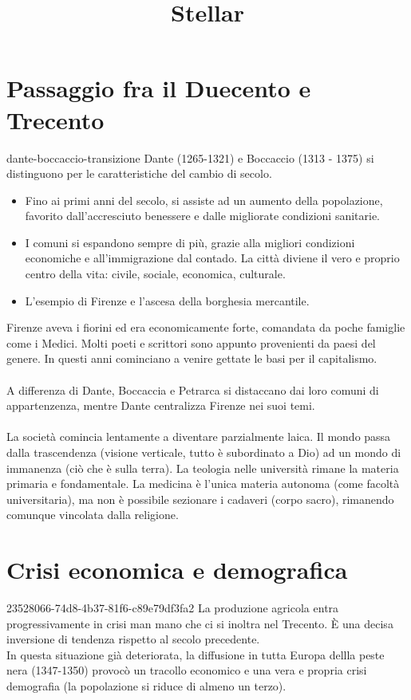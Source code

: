 \documentclass[preview]{standalone}
\begin{document}
\title{Stellar}
\genpage

\section{Passaggio fra il Duecento e Trecento}

\begin{snippet}{dante-boccaccio-transizione}
    Dante (1265-1321) e Boccaccio (1313 - 1375)
    si distinguono per le caratteristiche del cambio di secolo.
    
    \begin{itemize}
        \item Fino ai primi anni del secolo, si assiste ad un aumento della popolazione, favorito dall'accresciuto benessere e dalle migliorate condizioni sanitarie.
        \item I comuni si espandono sempre di più, grazie alla migliori condizioni economiche e all'immigrazione dal contado. La città diviene il vero e proprio centro della vita: civile, sociale, economica, culturale.
        \item L'esempio di Firenze e l'ascesa della borghesia mercantile.
    \end{itemize}
    
    Firenze aveva i fiorini ed era economicamente forte, comandata da poche famiglie come i Medici.
    Molti poeti e scrittori sono appunto provenienti da paesi del genere.
    In questi anni cominciano a venire gettate le basi per il capitalismo.
    \\\\
    A differenza di Dante, Boccaccia e Petrarca si distaccano dai loro comuni di appartenzenza,
    mentre Dante centralizza Firenze nei suoi temi.
    \\\\
    La società comincia lentamente a diventare parzialmente laica.
    Il mondo passa dalla trascendenza (visione verticale, tutto è subordinato a Dio)
    ad un mondo di immanenza (ciò che è sulla terra).
    La teologia nelle università rimane la materia primaria e fondamentale.
    La medicina è l'unica materia autonoma (come facoltà universitaria), ma non è possibile sezionare i cadaveri (corpo sacro),
    rimanendo comunque vincolata dalla religione.
\end{snippet}

\section{Crisi economica e demografica}

\begin{snippet}{23528066-74d8-4b37-81f6-c89e79df3fa2}
    La produzione agricola entra progressivamente in crisi man mano che ci si inoltra nel Trecento.
    È una decisa inversione di tendenza rispetto al secolo precedente.\\
    In questa situazione già deteriorata, la diffusione in tutta Europa dellla peste nera (1347-1350) provocò
    un tracollo economico e una vera e propria crisi demografia (la popolazione si riduce di almeno un terzo).
\end{snippet}
\end{document}
